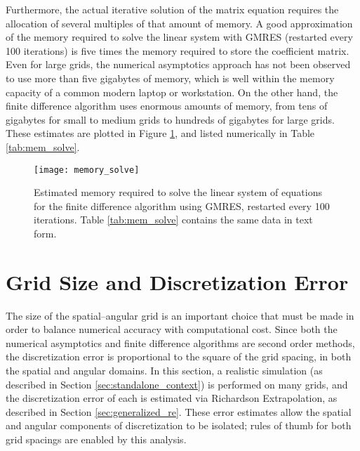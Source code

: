 Furthermore, the actual iterative solution of the matrix equation requires the allocation of several multiples of that amount of memory.
A good approximation of the memory required to solve the linear system with GMRES (restarted every 100 iterations) is five times the memory required to store the coefficient matrix.
Even for large grids, the numerical asymptotics approach has not been observed to use more than five gigabytes of memory, which is well within the memory capacity of a common modern laptop or workstation.
On the other hand, the finite difference algorithm uses enormous amounts of memory, from tens of gigabytes for small to medium grids to hundreds of gigabytes for large grids.
These estimates are plotted in Figure \ref{fig:mem_solve}, and listed numerically in Table \ref{tab:mem_solve}.
\begin{figure}[H]
  \centering
  \texttt{[image: memory\_solve]}
  \caption{Estimated memory required to solve the linear system of equations for the finite difference algorithm using GMRES, restarted every 100 iterations. Table \ref{tab:mem_solve} contains the same data in text form.}
  \label{fig:mem_solve}
\end{figure}

\section{Grid Size and Discretization Error}
\label{sec:grid_size}
The size of the spatial--angular grid is an important choice that must be made in order to balance numerical accuracy with computational cost.
Since both the numerical asymptotics and finite difference algorithms are second order methods, the discretization error is proportional to the square of the grid spacing, in both the spatial and angular domains.
In this section, a realistic simulation (as described in Section \ref{sec:standalone_context}) is performed on many grids, and the discretization error of each is estimated via Richardson Extrapolation, as described in Section \ref{sec:generalized_re}.
These error estimates allow the spatial and angular components of discretization to be isolated; rules of thumb for both grid spacings are enabled by this analysis.

